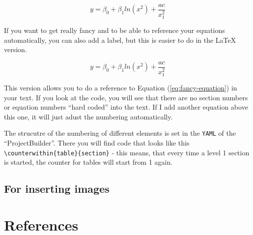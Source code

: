 \documentclass[10pt,twoside]{article}
\begin{document}
\[y = \beta_0 + \beta _1 ln(x^2) + \frac{ac}{x^2_1}\]

If you want to get really fancy and to be able to reference your
equations automatically, you can also add a label, but this is easier to
do in the LaTeX version.

\begin{equation}
y = \beta_0 + \beta _1 ln(x^2) + \frac{ac}{x^2_1}
\label{eq:fancy-equation}
\end{equation}

This version allows you to do a reference to Equation
(\ref{eq:fancy-equation}) in your text. If you look at the code, you
will see that there are no section numbers or equation numbers ``hard
coded'' into the text. If I add another equation above this one, it will
just adust the numbering automatically.

The strucutre of the numbering of different elements is set in the
\texttt{YAML} of the ``ProjectBuilder''. There you will find code that
looks like this
\texttt{\textbackslash{}counterwithin\{table\}\{section\}} - this means,
that every time a level 1 section is started, the counter for tables
will start from 1 again.

\hypertarget{for-inserting-images}{%
\subsection{For inserting images}\label{for-inserting-images}}

\FloatBarrier
\cleardoublepage


\fancyhead[LO,RE]{}

\listoffigures
{}

\FloatBarrier
\cleardoublepage


\listoftables
{}

\newpage
\FloatBarrier

\cleardoublepage
{}

\hypertarget{references}{%
\section*{References}\label{references}}
\end{document}
